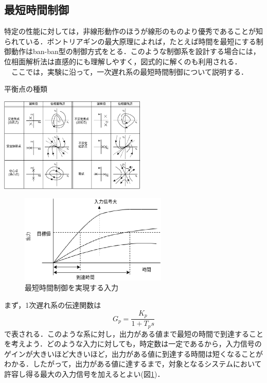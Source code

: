 \documentclass[12pt]{jsarticle}
\begin{document}
\subsection{最短時間制御}
特定の性能に対しては，非線形動作のほうが線形のものより優秀であることが知られている．ボントリアギンの最大原理によれば，たとえば時間を最短にする制御動作はban-ban型の制御方式をとる．このような制御系を設計する場合には，位相面解析法は直感的にも理解しやすく，図式的に解くのも利用される．\\
　ここでは，実験に沿って，一次遅れ系の最短時間制御について説明する．\\
\begin{table}[tb]
  \begin{center}
    \caption{平衡点の種類}
    \includegraphics[clip,width=7.0cm]{../Img/FigC1.eps}
    \label{FigC1}
  \end{center}
\end{table}
\begin{figure}[tb]
  \begin{center}
    \includegraphics[clip,width=7.0cm]{../Img/FigC4.eps}
    \caption{最短時間制御を実現する入力}
    \label{FigC4}
  \end{center}
\end{figure}
  まず，1次遅れ系の伝達関数は
\begin{equation}
\label{C10}
G_p = \frac{K_p}{1+T_ps}
\end{equation}
で表される．このような系に対し，出力がある値まで最短の時間で到達することを考えよう．どのような入力に対しても，時定数は一定であるから，入力信号のゲインが大きいほど大きいほど，出力がある値に到達する時間は短くなることがわかる．したがって，出力がある値に達するまで，対象となるシステムにおいて許容し得る最大の入力信号を加えるとよい(図\ref{FigC4})．\\
\end{document}
